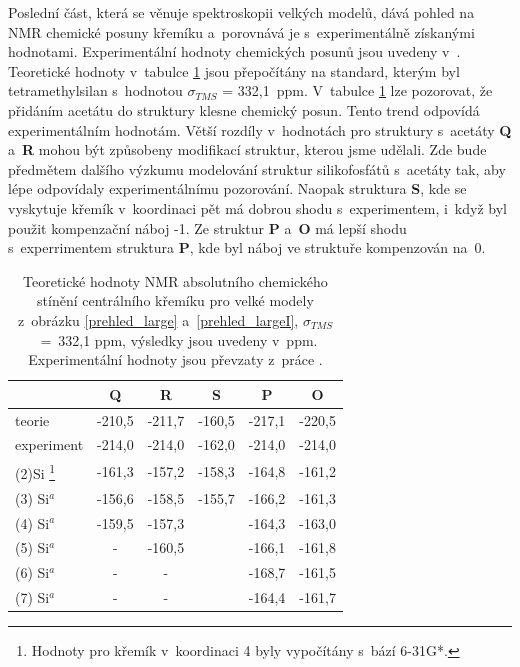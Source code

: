 \documentclass[
digital, %
table,   %
lof,     %
lot,     %
oneside,
]{fithesis3}
\begin{document}
Poslední část, která se věnuje spektroskopii velkých modelů, dává pohled na NMR chemické posuny křemíku a~porovnává je s~experimentálně získanými hodnotami. Experimentální hodnoty chemických posunů jsou uvedeny v~\cite{rtg_4_pinkas}. Teoretické hodnoty v~tabulce \ref{nmr} jsou přepočítány na standard, kterým byl tetramethylsilan s~hodnotou $\sigma_{TMS}$ = 332,1~ppm. V~tabulce \ref{nmr} lze pozorovat, že přidáním acetátu do struktury klesne chemický posun. Tento trend odpovídá experimentálním hodnotám. Větší rozdíly v~hodnotách pro struktury s~acetáty  \textbf{Q} a~\textbf{R} mohou být způsobeny modifikací struktur, kterou jsme udělali. Zde bude předmětem dalšího výzkumu modelování struktur silikofosfátů s~acetáty tak, aby lépe odpovídaly experimentálnímu pozorování. Naopak struktura  \textbf{S}, kde se vyskytuje křemík v~koordinaci pět má dobrou shodu s~experimentem, i~když byl použit kompenzační náboj -1. Ze struktur \textbf{P} a~\textbf{O} má lepší shodu s~experrimentem struktura \textbf{P}, kde byl náboj ve struktuře kompenzován na~0.

\begin{table}[H]
\begin{minipage}{\textwidth}
\caption{Teoretické hodnoty NMR absolutního chemického stínění centrálního křemíku pro velké modely z~obrázku \ref{prehled_large} a~\ref{prehled_largeI}, $\sigma_{TMS}$~=~332,1 ppm, výsledky jsou uvedeny v~ppm. Experimentální hodnoty jsou převzaty z~práce \cite{rtg_4_pinkas}.}
\begin{center}
\begin{tabular}{|l|c|c|c|c|c|}
\hline
\label{nmr} & \textbf{Q} & \textbf{R} &\textbf{S} & \textbf{P} & \textbf{O}  \\ \hline
teorie & -210,5 & -211,7 & \multicolumn{1}{r|}{-160,5} & -217,1 & -220,5 \\ \hline
experiment & -214,0 & -214,0 & -162,0 & -214,0 & -214,0 \\ \hline \hline
(2)Si \footnote{Hodnoty pro křemík v~koordinaci 4 byly vypočítány s~bází 6-31G*.} & -161,3 & -157,2 & -158,3& -164,8 & -161,2 \\ \hline
(3) Si$^a$ & -156,6 & -158,5 & -155,7 & -166,2 & -161,3 \\ \hline
(4) Si$^a$ & -159,5 & -157,3 &  & -164,3 & -163,0 \\ \hline
(5) Si$^a$ & - & -160,5 &  & -166,1 & -161,8 \\ \hline
(6) Si$^a$ &- & - &  & -168,7 & -161,5 \\ \hline
(7) Si$^a$ & - & - &  & -164,4 & -161,7 \\ \hline
\end{tabular}\end{center}\end{minipage}\end{table}
\end{document}
